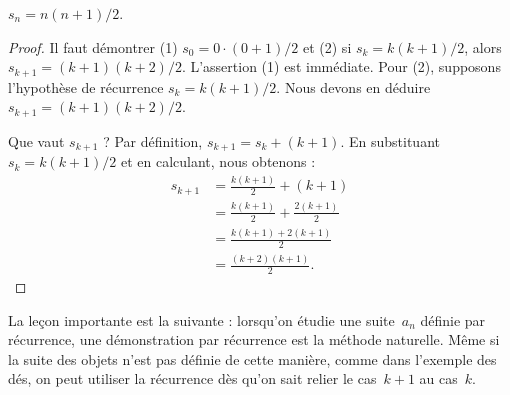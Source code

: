\documentclass[../../../include/open-logic-section]{subfiles}
\begin{document}
\begin{prop}
  $s_n = n(n+1)/2$.
\end{prop}

\begin{proof}
  Il faut démontrer
  (1) $s_0=0\cdot(0+1)/2$
  et
  (2) si
  $s_k=k(k+1)/2$,
  alors
  $s_{k+1}=(k+1)(k+2)/2$.
  L'assertion (1)
  est immédiate.
  Pour (2), supposons
  l'hypothèse de récurrence
  $s_k=k(k+1)/2$.
  Nous devons en déduire
  $s_{k+1}=(k+1)(k+2)/2$.

  Que vaut $s_{k+1}$ ?
  Par définition,
  $s_{k+1}=s_k+(k+1)$.
  En substituant
  $s_k=k(k+1)/2$
  et en calculant,
  nous obtenons :
  \begin{align*}
    s_{k+1}
      & = \frac{k(k+1)}{2}+(k+1)\\
      & = \frac{k(k+1)}{2}
        +\frac{2(k+1)}{2}\\
      & = \frac{k(k+1)+2(k+1)}{2}\\
      & = \frac{(k+2)(k+1)}{2}.
  \end{align*}
\end{proof}

La leçon importante est
la suivante : lorsqu'on
étudie une suite~$a_n$
définie par récurrence,
une démonstration par
récurrence est la
méthode naturelle.
Même si la suite des
objets n'est pas
définie de cette
manière, comme dans
l'exemple des dés,
on peut utiliser
la récurrence dès
qu'on sait relier
le cas~$k+1$ au
cas~$k$.
\end{document}
